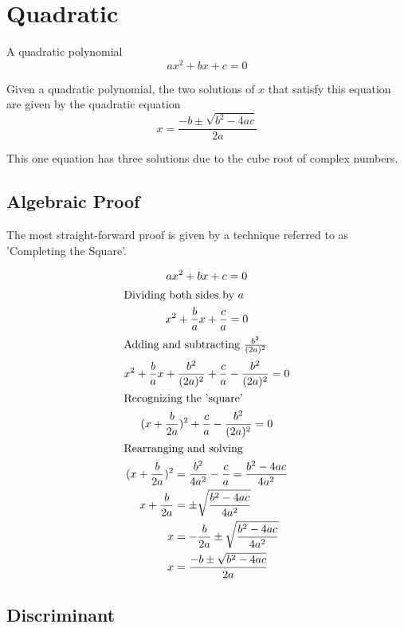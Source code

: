 \documentclass[a4paper]{article}
\begin{document}
\section{Quadratic}\label{sec:quadratic}

\begin{definition}\label{quad def}
A quadratic polynomial 
\[
ax^2 + bx + c = 0
\]
\end{definition}

Given a quadratic polynomial, the two solutions of $x$ that satisfy this equation are given by the quadratic equation
\begin{equation}
\boxed{
x = \frac{-b \pm \sqrt{b^2 - 4ac}}{2a}
}\label{eq:equation}
\end{equation}

This one equation has three solutions due to the cube root of complex numbers.

\subsection{Algebraic Proof}\label{subsec:algebraic-proof}
The most straight-forward proof is given by a technique referred to as 'Completing the Square'.

\begin{gather*}
ax^2 + bx + c = 0\\
\shortintertext{Dividing both sides by $a$}
x^2 + \frac{b}{a}x + \frac{c}{a} = 0\\
\shortintertext{Adding and subtracting $\frac{b^2}{(2a)^2}$}
x^2 + \frac{b}{a}x + \frac{b^2}{(2a)^2} +  \frac{c}{a} - \frac{b^2}{(2a)^2} = 0\\
\shortintertext{Recognizing the 'square'}
(x+ \frac{b}{2a})^2 +  \frac{c}{a} - \frac{b^2}{(2a)^2} = 0\\
\shortintertext{Rearranging and solving}
\begin{alignedat}{2}
(x + \frac{b}{2a})^2 &= \frac{b^2}{4a^2}-  \frac{c}{a}  = \frac{b^2-4ac}{4a^2}\\
x + \frac{b}{2a} &=\pm \sqrt{ \frac{b^2 - 4ac}{4a^2}}\\
x  &= - \frac{b}{2a} \pm \sqrt{ \frac{b^2 - 4ac}{4a^2}}\\
x  &= \frac{-b \pm \sqrt{b^2 - 4ac}}{2a}\\
\end{alignedat}
\end{gather*}

\subsection{Discriminant}\label{subsec:discriminant}
\end{document}
